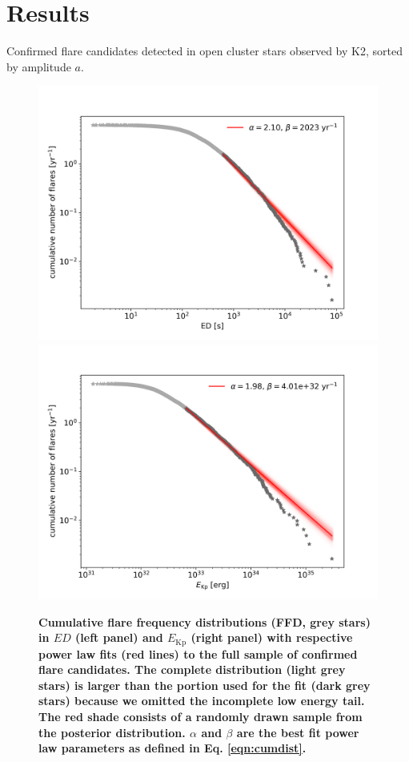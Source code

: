 \documentclass{aa}
\begin{document}
\section{Results}
\label{sec:results}
\begin{table}
\caption{Confirmed flare candidates detected in open cluster stars observed by K2, sorted by amplitude $a$.}
\label{tab:flares}
\centering
\footnotesize

\end{table}

\begin{figure}[ht!]
    \centering
    \includegraphics[width=0.49\hsize]{pics/FFDs/full_sample_ffd_ED_wheatland.png}
    \hspace{.01cm}
    \includegraphics[width=0.49\hsize]{pics/FFDs/full_sample_ffd_energy_wheatland.png}
    \caption{\textbf{Cumulative flare frequency distributions (FFD, grey stars) in $ED$ (left panel) and $E_\mathrm{Kp}$ (right panel) with respective power law fits (red lines) to the full sample of confirmed flare candidates. The complete distribution (light grey stars) is larger than the portion used for the fit (dark grey stars) because we omitted the incomplete low energy tail. The red shade consists of a randomly drawn sample from the posterior distribution. $\alpha$ and $\beta$ are the best fit power law parameters as defined in Eq. \ref{eqn:cumdist}.}}      
    \label{fig:powerlawfit_full}
\end{figure}
\end{document}
